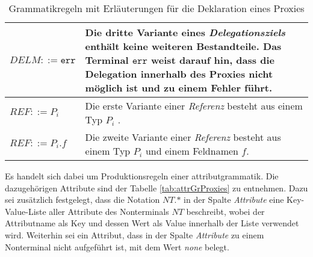 \begin{table}[H]
\begin{tabular}{|p{5cm}|p{9cm}|}
\hline
$\mathit{DELM} ::= \texttt{err} $  
& Die dritte Variante eines \emph{Delegationsziels} enthält keine weiteren Bestandteile. Das Terminal $\texttt{err}$ weist darauf hin, dass die Delegation innerhalb des Proxies nicht möglich ist und zu einem Fehler führt.\\
\hline
$\mathit{REF} ::= \mathit{P_i}$
& Die erste Variante einer \emph{Referenz} besteht aus einem Typ $P_i$ .\\
\hline
$\mathit{REF} ::= \mathit{P_i}\texttt{.}\mathit{f}$
& Die zweite Variante einer \emph{Referenz} besteht aus einem Typ $P_i$ und einem Feldnamen $f$.\\
\hline
\end{tabular}
\caption{Grammatikregeln mit Erläuterungen für die Deklaration eines Proxies}
 \label{tab:grProxies}
\end{table}
\noindent
Es handelt sich dabei um Produktionsregeln einer \Gls{attributgrammatik}. Die dazugehörigen Attribute sind der Tabelle \ref{tab:attrGrProxies} zu entnehmen. Dazu sei zusätzlich festgelegt, dass die Notation $\mathit{NT}\texttt{.}\text{*}$ in der Spalte \emph{Attribute} eine Key-Value-Liste aller Attribute des Nonterminals $\mathit{NT}$ beschreibt, wobei der Attributname als Key und dessen Wert als Value innerhalb der Liste verwendet wird. Weiterhin sei ein Attribut, dass in der Spalte \emph{Attribute} zu einem Nonterminal nicht aufgeführt ist, mit dem Wert \emph{none} belegt.
